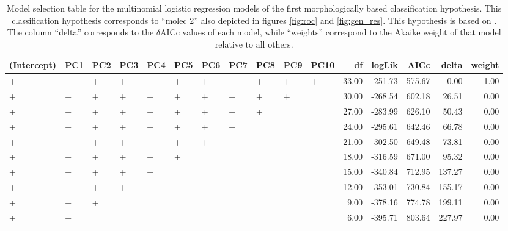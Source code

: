 \documentclass[12pt,letterpaper]{article}\usepackage{graphicx, color}
\begin{document}
\begin{table}
  \centering
{\small
\begin{tabular}{lllllllllllrrrrr}
  \hline
(Intercept) & PC1 & PC2 & PC3 & PC4 & PC5 & PC6 & PC7 & PC8 & PC9 & PC10 & df & logLik & AICc & delta & weight \\ 
  \hline
+ & + & + & + & + & + & + & + & + & + & + & 33.00 & -251.73 & 575.67 & 0.00 & 1.00 \\ 
  + & + & + & + & + & + & + & + & + & + &  & 30.00 & -268.54 & 602.18 & 26.51 & 0.00 \\ 
  + & + & + & + & + & + & + & + & + &  &  & 27.00 & -283.99 & 626.10 & 50.43 & 0.00 \\ 
  + & + & + & + & + & + & + & + &  &  &  & 24.00 & -295.61 & 642.46 & 66.78 & 0.00 \\ 
  + & + & + & + & + & + & + &  &  &  &  & 21.00 & -302.50 & 649.48 & 73.81 & 0.00 \\ 
  + & + & + & + & + & + &  &  &  &  &  & 18.00 & -316.59 & 671.00 & 95.32 & 0.00 \\ 
  + & + & + & + & + &  &  &  &  &  &  & 15.00 & -340.84 & 712.95 & 137.27 & 0.00 \\ 
  + & + & + & + &  &  &  &  &  &  &  & 12.00 & -353.01 & 730.84 & 155.17 & 0.00 \\ 
  + & + & + &  &  &  &  &  &  &  &  & 9.00 & -378.16 & 774.78 & 199.11 & 0.00 \\ 
  + & + &  &  &  &  &  &  &  &  &  & 6.00 & -395.71 & 803.64 & 227.97 & 0.00 \\ 
   \hline
\end{tabular}
}


  \caption{Model selection table for the multinomial logistic regression models of the first morphologically based classification hypothesis. This classification hypothesis corresponds to ``molec 2'' also depicted in figures \ref{fig:roc} and \ref{fig:gen_res}. This hypothesis is based on \citet{Seeliger1945}. The column ``delta'' corresponds to the \(\delta\)AICc values of each model, while ``weights'' correspond to the Akaike weight of that model relative to all others.}
  \label{tab:mod_sel_4}
\end{table}
\end{document}
